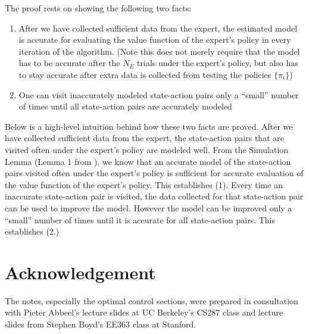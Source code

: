 \documentclass[a4paper]{article}
\begin{document}
The proof rests on showing the following two facts:
\begin{enumerate}
\item After we have collected sufficient data from the expert, the estimated model is accurate for evaluating
the value function of the expert’s policy in every iteration of the algorithm. (Note this does not merely require that the model has to be accurate after the $N_E$ trials under the expert’s policy, but also has to stay accurate
after extra data is collected from testing the policies $\{\pi_i\}$)
\item One can visit inaccurately modeled state-action pairs only a “small” number of times until all state-action pairs are accurately modeled
\end{enumerate}

Below is a high-level intuition behind how these two facts are proved.  After we have collected sufficient data from the expert, the state-action pairs that are visited often under the expert’s policy are modeled well. From the Simulation Lemma (Lemma 1 from \cite{abbeel2005exploration}), we know that an accurate model of the state-action pairs visited often under the expert’s policy is sufficient for accurate evaluation of the value function of the expert’s policy. This establishes (1). Every time an inaccurate state-action pair is visited, the data collected for that state-action pair can be used to improve the model. However the model can be improved only a “small” number of times until it is accurate for all state-action pairs. This establishes (2.)

\newpage
\section*{Acknowledgement}
The notes, especially the optimal control sections, were prepared in consultation with Pieter Abbeel's lecture slides at UC Berkeley's CS287 class and lecture slides from Stephen Boyd's EE363 class at Stanford. 


\end{document}
